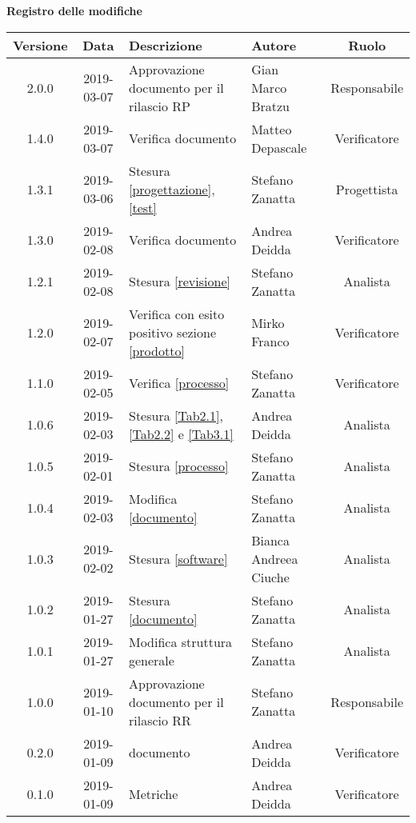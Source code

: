 	\begin{center}
		\textbf{Registro delle modifiche}
	\end{center}
	\begin{center}
		\begin{tabularx}{\textwidth}{|c|c|X|X|c|}
			\hline
			\textbf{Versione} & \textbf{Data} & \textbf{Descrizione} & \textbf{Autore} & \textbf{Ruolo} \\
			\hline
			2.0.0 & 2019-03-07 &  Approvazione documento per il rilascio RP & Gian Marco Bratzu & Responsabile \\
			\hline
			1.4.0 & 2019-03-07 &  Verifica documento & Matteo Depascale & Verificatore \\
			\hline
			1.3.1 & 2019-03-06 &  Stesura \ref{progettazione},\ref{test} & Stefano Zanatta & Progettista \\
			\hline
			1.3.0 & 2019-02-08 &  Verifica documento & Andrea Deidda & Verificatore \\
			\hline
			1.2.1 & 2019-02-08 &  Stesura \ref{revisione} & Stefano Zanatta & Analista \\
			\hline
			1.2.0 & 2019-02-07 & Verifica con esito positivo sezione \ref{prodotto} & Mirko Franco & Verificatore \\
			\hline
			1.1.0 & 2019-02-05 & Verifica \ref{processo}& Stefano Zanatta & Verificatore\\
			\hline
			1.0.6 & 2019-02-03 & Stesura \ref{Tab2.1}, \ref{Tab2.2} e \ref{Tab3.1} & Andrea Deidda & Analista\\
			\hline
			1.0.5 & 2019-02-01 & Stesura \ref{processo}& Stefano Zanatta & Analista\\
			\hline
			1.0.4 & 2019-02-03 & Modifica \ref{documento}& Stefano Zanatta & Analista\\
			\hline
			1.0.3 & 2019-02-02 & Stesura \ref{software}& Bianca Andreea Ciuche & Analista\\
			\hline
			1.0.2 & 2019-01-27 & Stesura \ref{documento}& Stefano Zanatta & Analista\\
			\hline
			1.0.1 & 2019-01-27 & Modifica struttura generale& Stefano Zanatta & Analista\\
			\hline
			1.0.0 & 2019-01-10 & Approvazione documento per il rilascio RR & Stefano Zanatta & Responsabile\\
			\hline
			0.2.0 & 2019-01-09 & \glossario{Verifica} documento & Andrea Deidda & Verificatore\\
			\hline
			0.1.0 & 2019-01-09 & \glossario{Verifica} Metriche & Andrea Deidda & Verificatore\\

\end{tabularx}
\end{center}
